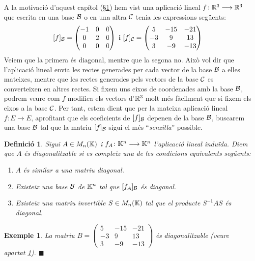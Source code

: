 \documentclass[
  11pt,
]{book}
\numberwithin{dummy}{section}
\theoremstyle{maincolornumbox}
\theoremstyle{blacknumex}
\newtheorem{exampleT}{Exemple}[chapter]
\theoremstyle{blacknumbox}
\newtheorem{definitionT}{Definició}[chapter]
\theoremstyle{maincolornum}
\newenvironment{definition}{\begin{dBox}\begin{definitionT}}{\end{definitionT}\end{dBox}}
\newenvironment{example}{\begin{exampleT}}{\hfill{\tiny\ensuremath{\blacksquare}}\end{exampleT}}
\begin{document}
A la motivació d'aquest capítol
(§\protect\hyperlink{subsec:motiv-diag}{1}) hem vist una aplicació lineal
\(f\colon \mathbb{R}^3\longrightarrow \mathbb{R}^3\) que escrita en una base \(\mathcal{B}\) o en una altra
\(\mathcal{C}\) tenia les expressions següents: \[[f]_{\mathcal{B}}=\begin{pmatrix}
-1 & 0 & 0 \\ 0 & 2 & 0 \\ 0 & 0 & 0
\end{pmatrix}
\text{ i }
[f]_{\mathcal{C}}=\begin{pmatrix}
5 & -15 & -21 \\ -3 & 9 & 13 \\ 3 & -9 & -13
\end{pmatrix}\] Veiem que la primera és diagonal, mentre que la segona
no. Això vol dir que l'aplicació lineal envia les rectes generades per
cada vector de la base \(\mathcal{B}\) a elles mateixes, mentre que les rectes
generades pels vectors de la base \(\mathcal{C}\) es converteixen en altres
rectes. Si fixem uns eixos de coordenades amb la base \(\mathcal{B}\), podrem
veure com \(f\) modifica els vectors d'\(\mathbb{R}^3\) molt més fàcilment que si
fixem els eixos a la base \(\mathcal{C}\). Per tant, estem dient que per la
mateixa aplicació lineal \(f\colon E \to E\), aprofitant que els
coeficients de \([f]_{\mathcal{B}}\) depenen de la base \(\mathcal{B}\), buscarem una base
\(\mathcal{B}\) tal que la matriu \([f]_{\mathcal{B}}\) sigui el més ``\emph{senzilla}''
possible.

\begin{definition}

Sigui \(A \in M_n(\mathbb{K})\) i \(f_A\colon \mathbb{K}^n\longrightarrow\mathbb{K}^n\) l'aplicació lineal
induïda. Diem que \emph{\(A\) és diagonalitzable} si es compleix una de les
condicions equivalents següents:

\begin{enumerate}
\def\labelenumi{\arabic{enumi}.}
\item
  \(A\) és similar a una matriu diagonal.
\item
  Existeix una base \(\mathcal{B}\) de \(\mathbb{K}^n\) tal que \([f_A]_{\mathcal{B}}\) és
  diagonal.
\item
  Existeix una matriu invertible \(S\in M_n(\mathbb{K})\) tal que el producte
  \(S^{-1}AS\) és diagonal.
\end{enumerate}

\end{definition}

\begin{example}
La matriu \(B=\left(\begin{smallmatrix} 5 & -15 & -21 \\ -3 & 9 & 13 \\ 3 & -9 & -13 \end{smallmatrix}\right)\) és diagonalitzable (veure apartat
\protect\hyperlink{subsec:motiv-diag}{1}).
\end{example}
\end{document}
